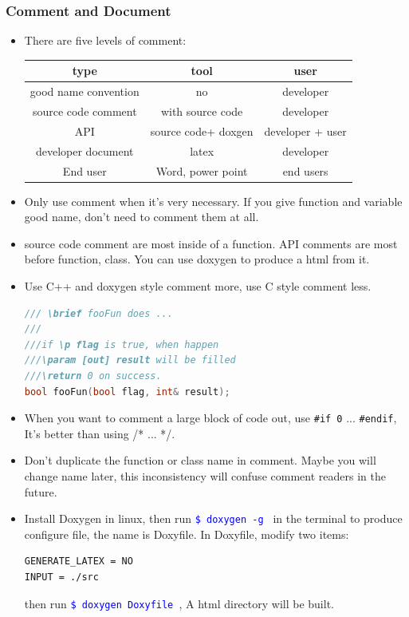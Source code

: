 \documentclass[a4paper,12pt,twoside]{book}
\newcommand{\linuxcommand}[1]{\texttt{\textcolor{blue}{\$ #1 \Pisymbol{psy}{191}}}}
\begin{document}
\subsubsection{Comment and Document}

\begin{itemize}
\item There are five levels of comment:
\begin{tabular}{|c|c|c|}
    \hline 
type & tool & user \\ 
    \hline 
good name convention & no & developer  \\ 
    \hline 
source code comment & with source code &  developer \\ 
    \hline 
API & source code+ doxgen  & developer + user  \\ 
    \hline 
developer document & latex &  developer \\ 
    \hline 
End user & Word, power point & end users  \\ 
    \hline 
\end{tabular} 

\item Only use comment when it's very necessary. If you give function and variable good name, don't need to comment them at all. 

\item source code comment are most inside of a function. API comments are most before function, class. You can use doxygen to produce a html from it. 

\item Use C++ and doxygen style comment more, use C style comment less.

\begin{lstlisting}[frame=single, language=c++]
/// \brief fooFun does ...
///
///if \p flag is true, when happen
///\param [out] result will be filled
///\return 0 on success.
bool fooFun(bool flag, int& result);
\end{lstlisting}

\item When you want to comment a large block of code out, use \texttt{\#if 0} ...  \texttt{\#endif}, It's better than using /* ... */. 

\item Don't duplicate the function or class name in comment. Maybe you will change name later, this inconsistency will confuse comment readers in the future.

\item Install Doxygen in linux, then run \linuxcommand{doxygen -g} in the terminal to produce configure file, the name is Doxyfile.  In Doxyfile, modify two items:
\begin{verbatim}
GENERATE_LATEX = NO
INPUT = ./src
\end{verbatim}
then run \linuxcommand{doxygen Doxyfile}, A html directory will be built.


\end{itemize}
\end{document}
